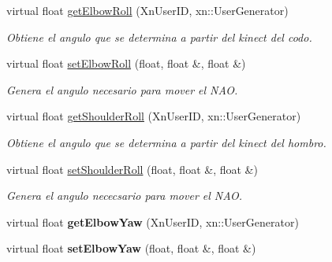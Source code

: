 \begin{DoxyCompactItemize}
\item 
virtual float \hyperlink{class_r_arm_a5c91fecc7fea6e246ce87aac487bde4f}{get\-Elbow\-Roll} (Xn\-User\-I\-D, xn\-::\-User\-Generator)
\begin{DoxyCompactList}\small\item\em Obtiene el angulo que se determina a partir del kinect del codo. \end{DoxyCompactList}\item 
\hypertarget{class_r_arm_a4788e34770371ab502e1a0d35ec41231}{virtual float \hyperlink{class_r_arm_a4788e34770371ab502e1a0d35ec41231}{set\-Elbow\-Roll} (float, float \&, float \&)}\label{class_r_arm_a4788e34770371ab502e1a0d35ec41231}

\begin{DoxyCompactList}\small\item\em Genera el angulo necesario para mover el N\-A\-O. \end{DoxyCompactList}\item 
\hypertarget{class_r_arm_a273b56a909d68b769dc1ee4aab39fa55}{virtual float \hyperlink{class_r_arm_a273b56a909d68b769dc1ee4aab39fa55}{get\-Shoulder\-Roll} (Xn\-User\-I\-D, xn\-::\-User\-Generator)}\label{class_r_arm_a273b56a909d68b769dc1ee4aab39fa55}

\begin{DoxyCompactList}\small\item\em Obtiene el angulo que se determina a partir del kinect del hombro. \end{DoxyCompactList}\item 
\hypertarget{class_r_arm_aef1de77829d8fe536eed27639408771b}{virtual float \hyperlink{class_r_arm_aef1de77829d8fe536eed27639408771b}{set\-Shoulder\-Roll} (float, float \&, float \&)}\label{class_r_arm_aef1de77829d8fe536eed27639408771b}

\begin{DoxyCompactList}\small\item\em Genera el angulo nececsario para mover el N\-A\-O. \end{DoxyCompactList}\item 
\hypertarget{class_r_arm_a2647e80238d7767765777fae35ec92bb}{virtual float {\bfseries get\-Elbow\-Yaw} (Xn\-User\-I\-D, xn\-::\-User\-Generator)}\label{class_r_arm_a2647e80238d7767765777fae35ec92bb}

\item 
\hypertarget{class_r_arm_a72b8946ae53bc1697bdd8371468334ba}{virtual float {\bfseries set\-Elbow\-Yaw} (float, float \&, float \&)}\label{class_r_arm_a72b8946ae53bc1697bdd8371468334ba}

\end{DoxyCompactItemize}



